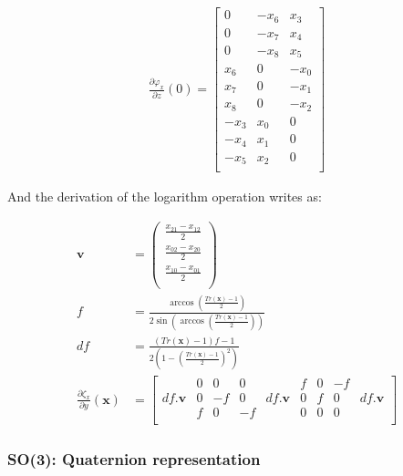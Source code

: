 \begin{align}
\label{eq:diffRetrSO3Matrix}
  \frac{\partial \varphi_x}{\partial z}(0) = 
  \begin{bmatrix}
    0 & -x_6 & x_3 \\
    0 & -x_7 & x_4 \\
    0 & -x_8 & x_5 \\
    x_6 & 0 & -x_0 \\
    x_7 & 0 & -x_1 \\
    x_8 & 0 & -x_2 \\
    -x_3 & x_0 & 0 \\
    -x_4 & x_1 & 0 \\
    -x_5 & x_2 & 0 \\
  \end{bmatrix}
\end{align}

And the derivation of the logarithm operation writes as:

\begin{align}
\label{eq:diffLogSO3Matrix}
  \mathbf{v} &= \begin{pmatrix}
    \frac{x_{21} - x_{12}}{2}\\
    \frac{x_{02} - x_{20}}{2}\\
    \frac{x_{10} - x_{01}}{2}\\
  \end{pmatrix} \\
  f &= \frac{\arccos \left( \frac{Tr(\mathbf{x})-1}{2} \right)}{2 \sin \left( \arccos \left( \frac{Tr(\mathbf{x})-1}{2} \right) \right) } \\
  df &= \frac{\left(Tr(\mathbf{x})-1\right)f-1}{2 \left( 1- \left( \frac{Tr(\mathbf{x})-1}{2} \right)^2 \right)} \\
  \frac{\partial \zeta_x}{\partial y}(\mathbf{x}) &= \begin{bmatrix}
      & 0 & 0 & 0 &  & f & 0 & -f &  \\ 
    df.\mathbf{v} & 0 & -f & 0 & df.\mathbf{v} & 0 & f & 0 & df.\mathbf{v}  \\ 
      & f & 0 & -f &  & 0 & 0 & 0 &  \\ 
  \end{bmatrix}
\end{align}

\subsubsection{SO(3): Quaternion representation}
\label{ssub:so(3)_quaternion_representation}

